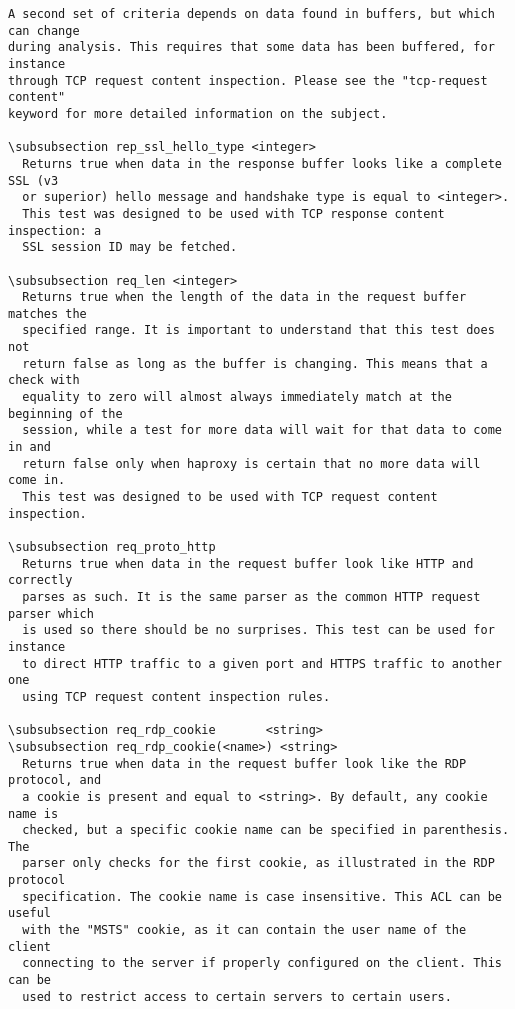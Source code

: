 \begin{verbatim}
A second set of criteria depends on data found in buffers, but which can change
during analysis. This requires that some data has been buffered, for instance
through TCP request content inspection. Please see the "tcp-request content"
keyword for more detailed information on the subject.

\subsubsection rep_ssl_hello_type <integer>
  Returns true when data in the response buffer looks like a complete SSL (v3
  or superior) hello message and handshake type is equal to <integer>.
  This test was designed to be used with TCP response content inspection: a
  SSL session ID may be fetched.

\subsubsection req_len <integer>
  Returns true when the length of the data in the request buffer matches the
  specified range. It is important to understand that this test does not
  return false as long as the buffer is changing. This means that a check with
  equality to zero will almost always immediately match at the beginning of the
  session, while a test for more data will wait for that data to come in and
  return false only when haproxy is certain that no more data will come in.
  This test was designed to be used with TCP request content inspection.

\subsubsection req_proto_http
  Returns true when data in the request buffer look like HTTP and correctly
  parses as such. It is the same parser as the common HTTP request parser which
  is used so there should be no surprises. This test can be used for instance
  to direct HTTP traffic to a given port and HTTPS traffic to another one
  using TCP request content inspection rules.

\subsubsection req_rdp_cookie       <string>
\subsubsection req_rdp_cookie(<name>) <string>
  Returns true when data in the request buffer look like the RDP protocol, and
  a cookie is present and equal to <string>. By default, any cookie name is
  checked, but a specific cookie name can be specified in parenthesis. The
  parser only checks for the first cookie, as illustrated in the RDP protocol
  specification. The cookie name is case insensitive. This ACL can be useful
  with the "MSTS" cookie, as it can contain the user name of the client
  connecting to the server if properly configured on the client. This can be
  used to restrict access to certain servers to certain users.


\end{verbatim}
